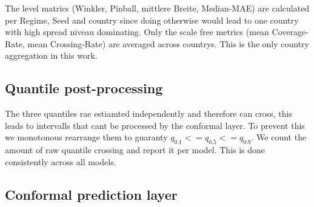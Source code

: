 The level matrics (Winkler, Pinball, mittlere Breite, Median-MAE) are calculated per Regime, Seed and country since doing otherwise would lead to one country with high spread niveau dominating. Only the scale free metrics (mean Coverage-Rate, mean Crossing-Rate) are averaged across countrys. This is the only country aggregation in this work.



\subsection{Quantile post-processing}
\label{sec:exp:rearrange}

%

The three quantiles rae estiamted independently and therefore can cross, this leads to intervalls that cant be processed by the conformal layer. To prevent this we monotonous rearrange them \parencite{chernozhukov2010} to guaranty $q_0.1 <= q_0.5 <= q_0.9$. We count the amount of raw quantile crossing and report it per model. This is done consistently across all models. 


\subsection{Conformal prediction layer}
\label{sec:exp:conformal-ref}


